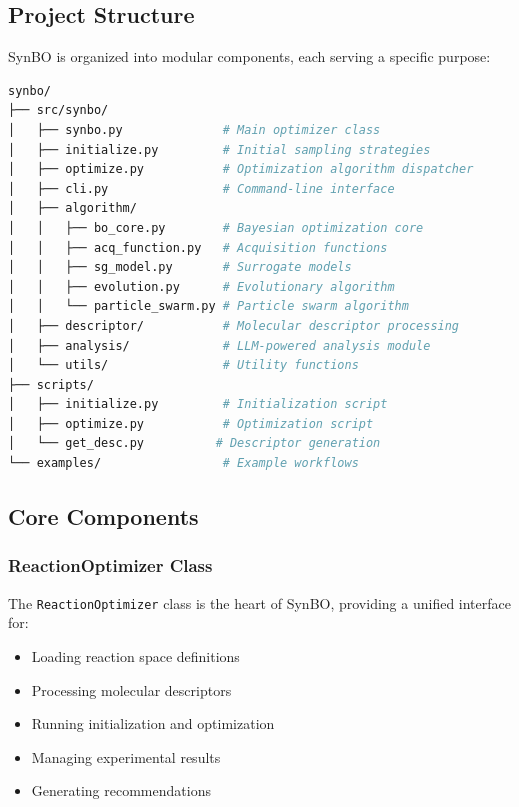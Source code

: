 \documentclass[12pt,a4paper]{article}
\begin{document}
\subsection{Project Structure}

SynBO is organized into modular components, each serving a specific purpose:

\begin{lstlisting}[language=bash, caption=SynBO Project Structure]
synbo/
├── src/synbo/
│   ├── synbo.py              # Main optimizer class
│   ├── initialize.py         # Initial sampling strategies
│   ├── optimize.py           # Optimization algorithm dispatcher
│   ├── cli.py                # Command-line interface
│   ├── algorithm/
│   │   ├── bo_core.py        # Bayesian optimization core
│   │   ├── acq_function.py   # Acquisition functions
│   │   ├── sg_model.py       # Surrogate models
│   │   ├── evolution.py      # Evolutionary algorithm
│   │   └── particle_swarm.py # Particle swarm algorithm
│   ├── descriptor/           # Molecular descriptor processing
│   ├── analysis/             # LLM-powered analysis module
│   └── utils/                # Utility functions
├── scripts/
│   ├── initialize.py         # Initialization script
│   ├── optimize.py           # Optimization script
│   └── get_desc.py          # Descriptor generation
└── examples/                 # Example workflows
\end{lstlisting}

\subsection{Core Components}

\subsubsection{ReactionOptimizer Class}

The \texttt{ReactionOptimizer} class is the heart of SynBO, providing a unified interface for:

\begin{itemize}
    \item Loading reaction space definitions
    \item Processing molecular descriptors
    \item Running initialization and optimization
    \item Managing experimental results
    \item Generating recommendations
\end{itemize}
\end{document}
